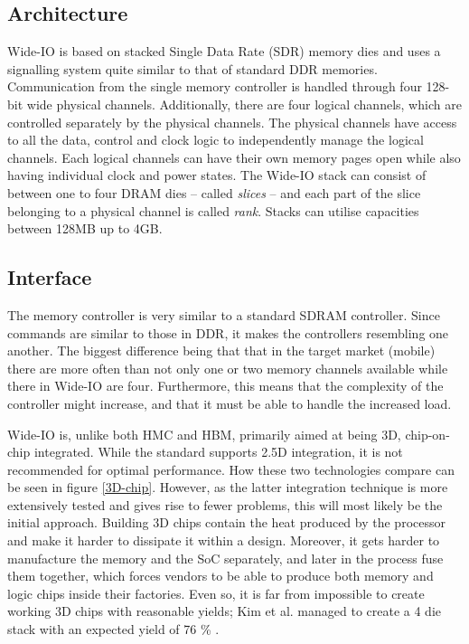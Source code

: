 \subsection{Architecture}
Wide-IO is based on stacked Single Data Rate (SDR) memory dies and uses a signalling system quite similar to that of standard DDR memories. Communication from the single memory controller is handled through four 128-bit wide physical channels. Additionally, there are four logical channels, which are controlled separately by the physical channels. The physical channels have access to all the data, control and clock logic to independently manage the logical channels. Each logical channels can have their own memory pages open while also having individual clock and power states. The Wide-IO stack can consist of between one to four DRAM dies -- called \emph{slices} -- and each part of the slice belonging to a physical channel is called \emph{rank}. Stacks can utilise capacities between 128MB up to 4GB. 

\subsection{Interface}
The memory controller is very similar to a standard SDRAM controller. Since commands are similar to those in DDR, it makes the controllers resembling one another. The biggest difference being that that in the target market (mobile) there are more often than not only one or two memory channels available while there in Wide-IO are four. Furthermore, this means that the complexity of the controller might increase, and that it must be able to handle the increased load. 
\bigskip

Wide-IO is, unlike both HMC and HBM, primarily aimed at being 3D, chip-on-chip integrated. While the standard supports 2.5D integration, it is not recommended for optimal performance. How these two technologies compare can be seen in figure \ref{3D-chip}. However, as the latter integration technique is more extensively tested and gives rise to fewer problems, this will most likely be the initial approach. Building 3D chips contain the heat produced by the processor and make it harder to dissipate it within a design. Moreover, it gets harder to manufacture the memory and the SoC separately, and later in the process fuse them together, which forces vendors to be able to produce both memory and logic chips inside their factories. Even so, it is far from impossible to create working 3D chips with reasonable yields; Kim et al. managed to create a 4 die stack with an expected yield of 76 \% \cite{kim20121}. 

